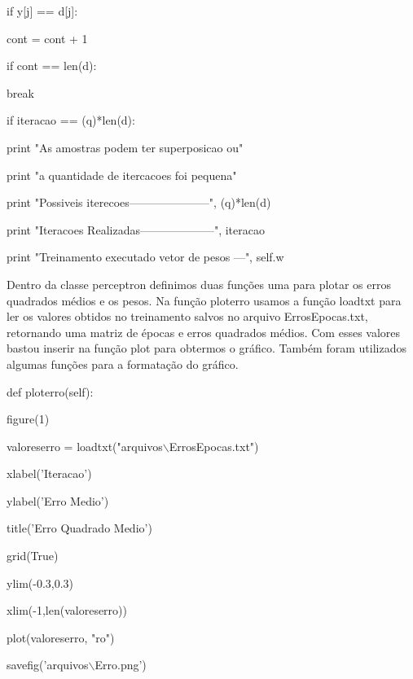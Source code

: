 \documentclass[
12pt, 
a4paper,
oneside,			%
english,			%
french,				%
spanish,			%
brazil,	
]{abntex2}
\begin{document}
\hspace{2,5cm}if y[j] == d[j]:

\hspace{3,0cm}cont = cont + 1

\hspace{2,0cm}if cont == len(d): 

\hspace{2,5cm}break

\hspace{1,5cm}if iteracao == (q)*len(d): 

\hspace{2,0cm}print "As amostras podem ter  superposicao ou"

\hspace{2,0cm}print "a quantidade de itercacoes foi pequena"

\hspace{1,5cm}print "Possiveis iterecoes---------------------", (q)*len(d)

\hspace{1,5cm}print "Iteracoes Realizadas--------------------", iteracao

\hspace{1,5cm}print "Treinamento executado vetor de pesos ---", self.w  


Dentro da classe perceptron definimos duas funções uma para plotar os erros quadrados médios e os pesos. Na função ploterro usamos a função loadtxt para ler os valores obtidos no treinamento salvos no arquivo ErrosEpocas.txt, retornando uma matriz de épocas e erros quadrados médios. Com esses valores bastou inserir na função plot para obtermos o gráfico. Também foram utilizados algumas funções para a formatação do gráfico.    

def ploterro(self): 

\setlength{\parindent}{1,5 cm}
 
 
 figure(1)
 
 valoreserro = loadtxt("arquivos$\backslash$ErrosEpocas.txt")  
  
 xlabel('Iteracao')
 
 ylabel('Erro Medio')
 
 title('Erro Quadrado Medio')
 
 grid(True)
 
 ylim(-0.3,0.3)
 
 xlim(-1,len(valoreserro))
 
 plot(valoreserro, "ro")
 
 savefig('arquivos$\backslash$Erro.png')
 
\end{document}
